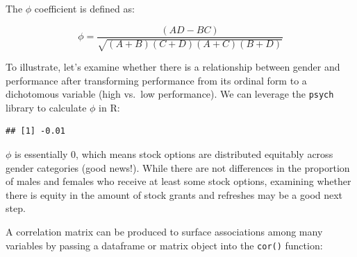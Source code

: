\documentclass[
]{book}
\newenvironment{Shaded}{\begin{snugshade}}{\end{snugshade}}
\newcommand{\CommentTok}[1]{\textcolor[rgb]{0.56,0.35,0.01}{\textit{#1}}}
\newcommand{\DecValTok}[1]{\textcolor[rgb]{0.00,0.00,0.81}{#1}}
\newcommand{\FunctionTok}[1]{\textcolor[rgb]{0.00,0.00,0.00}{#1}}
\newcommand{\NormalTok}[1]{#1}
\newcommand{\OtherTok}[1]{\textcolor[rgb]{0.56,0.35,0.01}{#1}}
\newcommand{\SpecialCharTok}[1]{\textcolor[rgb]{0.00,0.00,0.00}{#1}}
\newcommand{\StringTok}[1]{\textcolor[rgb]{0.31,0.60,0.02}{#1}}
\begin{document}
The \(\phi\) coefficient is defined as:

\[ \phi = {\frac {(AD-BC)}{\sqrt{(A+B)(C+D)(A+C)(B+D)}}} \]

To illustrate, let's examine whether there is a relationship between gender and performance after transforming performance from its ordinal form to a dichotomous variable (high vs.~low performance). We can leverage the \texttt{psych} library to calculate \(\phi\) in R:

\begin{Shaded}
\end{Shaded}

\begin{verbatim}
## [1] -0.01
\end{verbatim}

\(\phi\) is essentially 0, which means stock options are distributed equitably across gender categories (good news!). While there are not differences in the proportion of males and females who receive at least some stock options, examining whether there is equity in the amount of stock grants and refreshes may be a good next step.

A correlation matrix can be produced to surface associations among many variables by passing a dataframe or matrix object into the \texttt{cor()} function:
\end{document}
